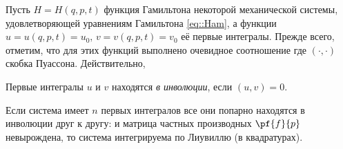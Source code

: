 \documentclass[a4paper,12pt]{article}
\newcommand{\tdf}[1]{\textsl{#1}}
\begin{document}
Пусть $H=H(q,p,t)$ функция Гамильтона некоторой механической системы, удовлетворяющей уравнениям Гамильтона \eqref{eq::Ham},
а функции $u=u(q,p,t)=u_0,\,v=v(q,p,t)=v_0$ её первые интегралы. Прежде всего, отметим,
что для этих функций выполнено очевидное соотношение
где $(\cdot,\cdot)$ скобка Пуассона. Действительно,
\begin{df}
Первые интегралы $u$ и $v$ находятся \tdf{в инволюции}, если $(u,v)=0$.
\end{df}
\begin{theorem}[Лиувилль]
\label{thm::int_liuv}
Если система имеет $n$ первых интегралов
все они попарно находятся в инволюции друг к другу:
и матрица частных производных $\pf{f}{p}$ невырождена,
то система интегрируема по Лиувиллю (в квадратурах).
\end{theorem}
\end{document}
